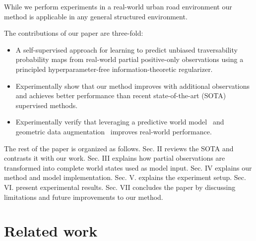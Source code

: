 \documentclass[letterpaper, 10 pt, conference]{ieeeconf}
\begin{document}
While we perform experiments in a real-world urban road environment our method is applicable in any general structured environment.





The contributions of our paper are three-fold:
\begin{itemize}
    \item A self-supervised approach for learning to predict unbiased traversability probability maps from real-world partial positive-only observations using a principled hyperparameter-free information-theoretic regularizer.
    \item Experimentally show that our method improves with additional observations and achieves better performance than recent state-of-the-art (SOTA) supervised methods.
\item Experimentally verify that leveraging a predictive world model~\cite{karlsson2023pred_wm} and geometric data augmentation~\cite{karlsson2020dsla} improves real-world performance.
\end{itemize}

The rest of the paper is organized as follows. Sec. II reviews the SOTA and contrasts it with our work. Sec. III explains how partial observations are transformed into complete world states used as model input. Sec. IV explains our method and model implementation. Sec. V. explains the experiment setup. Sec. VI. present experimental results. Sec. VII concludes the paper
by discussing limitations and future improvements to our method.

\section{Related work}
\end{document}
